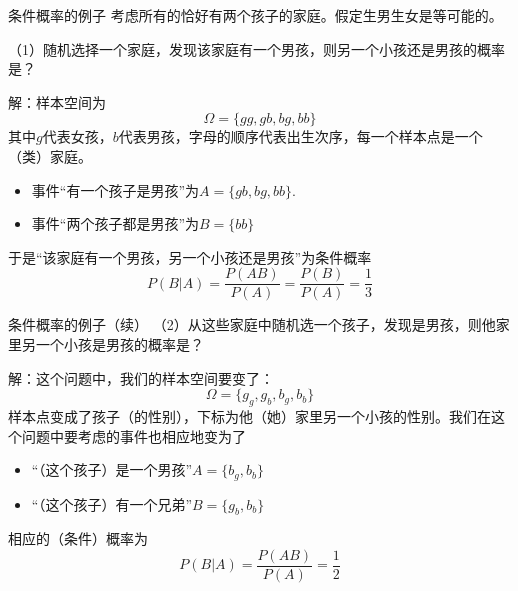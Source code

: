 \documentclass[10pt]{beamer}
\begin{document}
\begin{frame}

\begin{block}{条件概率的例子}
考虑所有的恰好有两个孩子的家庭。假定生男生女是等可能的。

\vspace{1em}

（1）{\color{red}随机选择一个家庭}，发现该家庭有一个男孩，则另一个小孩还是男孩的概率是？

\vspace{1em}
\pause

解：样本空间为
$$\Omega = \{gg, gb, bg, bb\}$$
其中$g$代表女孩，$b$代表男孩，字母的顺序代表出生次序，每一个样本点是一个（类）家庭。
\begin{itemize}
\item 事件``有一个孩子是男孩''为$A = \{gb,bg,bb\}$.
\item 事件``两个孩子都是男孩''为$B = \{bb\}$
\end{itemize}

于是``该家庭有一个男孩，另一个小孩还是男孩''为条件概率
$$P(B|A) = \dfrac{P(AB)}{P(A)} = \dfrac{P(B)}{P(A)} = \dfrac{1}{3}$$
\end{block}

\end{frame}


\begin{frame}

\begin{block}{条件概率的例子（续）}
（2）从这些家庭中{\color{red}随机选一个孩子}，发现是男孩，则他家里另一个小孩是男孩的概率是？

\vspace{1em}
\pause

解：这个问题中，我们的样本空间要变了：
$$\Omega = \{g_g, g_b, b_g, b_b\}$$
样本点变成了孩子（的性别），下标为他（她）家里另一个小孩的性别。我们在这个问题中要考虑的事件也相应地变为了
\begin{itemize}
\item ``（这个孩子）是一个男孩''$A = \{b_g, b_b\}$
\item ``（这个孩子）有一个兄弟''$B = \{g_b, b_b\}$
\end{itemize}
相应的（条件）概率为
$$P(B|A) = \dfrac{P(AB)}{P(A)} = \dfrac{1}{2}$$
\end{block}

\end{frame}

\end{document}
